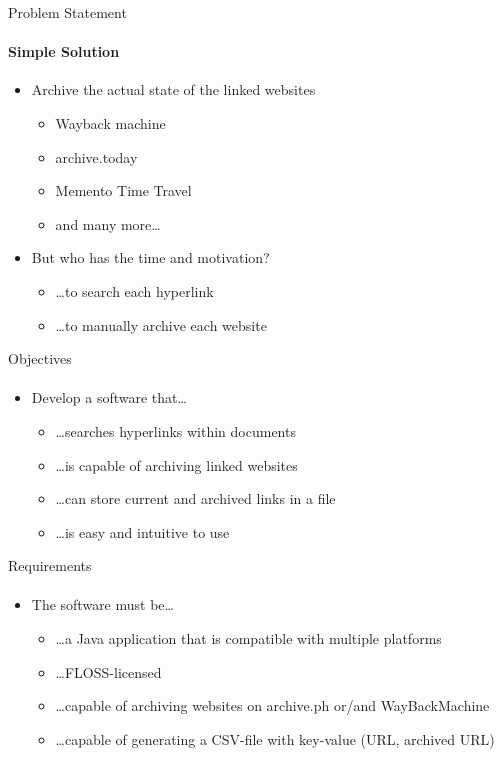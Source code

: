 \documentclass[
    ngerman,%
    authorontitle=true,
]{bfhbeamer}
\begin{document}
    \begin{frame}{Problem Statement}
        \framesubtitle{Simple Solution}
        \begin{itemize}
            \item Archive the actual state of the linked websites
            \begin{itemize}
                \item Wayback machine
                \item archive.today
                \item Memento Time Travel
                \item and many more…
            \end{itemize}
            \item But who has the time and motivation?
            \begin{itemize}
                \item \ldots to search each hyperlink
                \item \ldots to manually archive each website
            \end{itemize}
        \end{itemize}
    \end{frame}

    \begin{frame}{Objectives}
        \framesubtitle{}
        \begin{itemize}
            \item Develop a software that\ldots
            \begin{itemize}
                \item \ldots searches hyperlinks within documents
                \item \ldots is capable of archiving linked websites
                \item \ldots can store current and archived links in a file
                \item \ldots is easy and intuitive to use
            \end{itemize}
        \end{itemize}
    \end{frame}

    \begin{frame}{Requirements}
        \framesubtitle{}
        \begin{itemize}
            \item The software must be\ldots
            \begin{itemize}
                \item \ldots a Java application that is compatible with multiple platforms
                \item \ldots FLOSS-licensed
                \item \ldots capable of archiving websites on archive.ph or/and WayBackMachine
                \item \ldots capable of generating a CSV-file with key-value (URL, archived URL)
            \end{itemize}
        \end{itemize}

    \end{frame}
\end{document}
